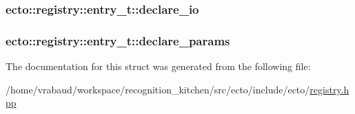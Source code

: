 \subsubsection[{\texorpdfstring{declare\+\_\+io}{declare_io}}]{ ecto\+::registry\+::entry\+\_\+t\+::declare\+\_\+io}\hypertarget{structecto_1_1registry_1_1entry__t_ac052cec6adea69584fbb17f24e147ec2}{}\label{structecto_1_1registry_1_1entry__t_ac052cec6adea69584fbb17f24e147ec2}
\subsubsection[{\texorpdfstring{declare\+\_\+params}{declare_params}}]{ ecto\+::registry\+::entry\+\_\+t\+::declare\+\_\+params}\hypertarget{structecto_1_1registry_1_1entry__t_a0e87799ee057b4509d45eab85def3b80}{}\label{structecto_1_1registry_1_1entry__t_a0e87799ee057b4509d45eab85def3b80}


The documentation for this struct was generated from the following file\+:\begin{DoxyCompactItemize}
\item 
/home/vrabaud/workspace/recognition\+\_\+kitchen/src/ecto/include/ecto/\hyperlink{registry_8hpp}{registry.\+hpp}\end{DoxyCompactItemize}
